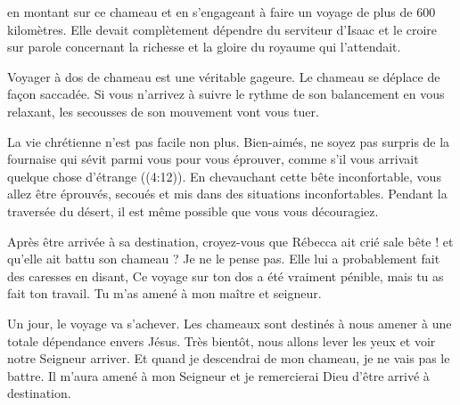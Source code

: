  en montant sur ce chameau et en s'engageant à faire un voyage
 de plus de 600 kilomètres.
 Elle devait complètement dépendre du serviteur d'Isaac
 et le croire sur parole concernant la richesse
 et la gloire du royaume qui l'attendait. 

Voyager à dos de chameau est une véritable gageure.
 Le chameau se déplace de façon saccadée.
 Si vous n'arrivez à suivre le rythme de son balancement
 en vous relaxant, les secousses de son mouvement vont vous tuer.

La vie chrétienne n'est pas facile non plus.
 \og Bien-aimés, ne soyez pas surpris de la fournaise qui sévit
 parmi vous pour vous éprouver, comme s'il vous arrivait
 quelque chose d'étrange \fg{} ((4:12)).
 En chevauchant cette bête inconfortable, vous allez être éprouvés,
 secoués et mis dans des situations inconfortables.
 Pendant la traversée du désert,
 il est même possible que vous vous découragiez. 

Après être arrivée à sa destination,
 croyez-vous que Rébecca ait crié \og sale bête ! \fg{}
 et qu'elle ait battu son chameau ? Je ne le pense pas.
 Elle lui a probablement fait des caresses en disant,
 \og Ce voyage sur ton dos a été vraiment pénible,
 mais tu as fait ton travail. Tu m'as amené à mon maître et seigneur. \fg{}


Un jour, le voyage va s'achever. Les chameaux sont destinés à nous amener
 à une totale dépendance envers Jésus.
 Très bientôt, nous allons lever les yeux et voir notre Seigneur arriver.
 Et quand je descendrai de mon chameau, je ne vais pas le battre.
 Il m'aura amené à mon Seigneur et je remercierai Dieu
 d'être arrivé à destination. 

\dvrule






